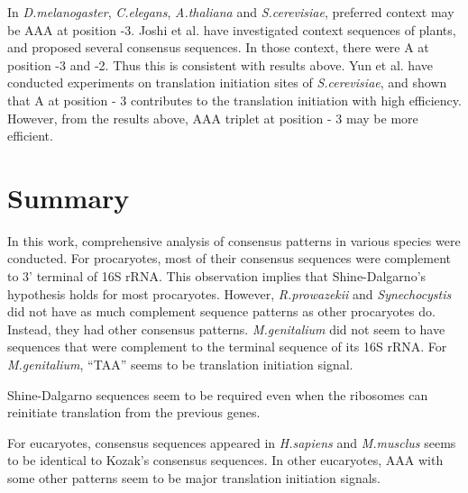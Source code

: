 In {\it D.melanogaster}, {\it C.elegans}, {\it A.thaliana} and {\it
S.cerevisiae}, preferred context may be AAA at position -3. Joshi et
al.\cite{label701} have investigated context sequences of plants, and
proposed several consensus sequences. In those context, there were A
at position -3 and -2. Thus this is consistent with results above. Yun
et al.\cite{label30} have conducted experiments on translation
initiation sites of {\it S.cerevisiae}, and shown that A at position -
3 contributes to the translation initiation with high
efficiency. However, from the results above, AAA triplet at position -
3 may be more efficient.

\section{Summary}

In this work, comprehensive analysis of consensus patterns in various
species were conducted. For procaryotes, most of their consensus
sequences were complement to 3' terminal of 16S rRNA. This observation
implies that Shine-Dalgarno's hypothesis holds for most
procaryotes. However, {\it R.prowazekii} and {\it Synechocystis} did not
have as much complement sequence patterns as other procaryotes
do. Instead, they had other consensus patterns.  {\it M.genitalium} did
not seem to have sequences that were complement to the terminal sequence
of its 16S rRNA.  For {\it M.genitalium}, ``TAA'' seems to be
translation initiation signal.

Shine-Dalgarno sequences seem to be required even when the ribosomes
can reinitiate translation from the previous genes.

For eucaryotes, consensus sequences appeared in {\it H.sapiens} and
{\it M.musclus} seems to be identical to Kozak's consensus
sequences. In other eucaryotes, AAA with some other patterns seem to
be major translation initiation signals.

